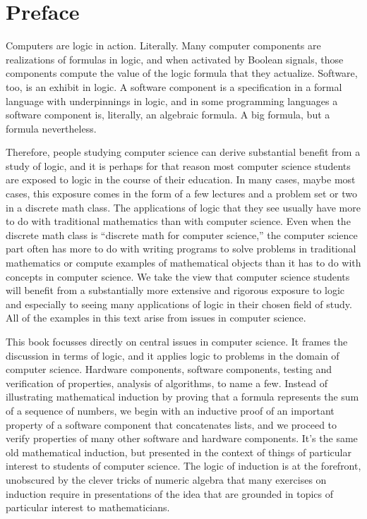 \chapter{Preface}
\label{ch:Preface}

Computers are logic in action. Literally.
Many computer components are realizations of formulas in logic,
and when activated by Boolean signals, those components
compute the value of the logic formula that they actualize.
Software, too, is an exhibit in logic.
A software component is a specification in a formal language
with underpinnings in logic,
and in some programming languages a software component
is, literally, an algebraic formula.
A big formula, but a formula nevertheless.

Therefore, people studying computer science
can derive substantial benefit from a study of logic,
and it is perhaps for that reason most computer science students 
are exposed to logic in the course of their education.
In many cases, maybe most cases, this exposure comes
in the form of a few lectures and a problem set or two
in a discrete math class. The applications of logic that
they see usually have more to do with traditional mathematics
than with computer science. Even when the discrete math class
is ``discrete math for computer science,'' the computer science
part often has more to do with writing programs to solve problems
in traditional mathematics or compute examples of
mathematical objects than it has to do with
concepts in computer science.
We take the view that computer science students will
benefit from a substantially more extensive and rigorous
exposure to logic and especially to seeing many applications of
logic in their chosen field of study.
All of the examples in this text arise from issues in computer science.

This book focusses directly on central issues
in computer science.
It frames the discussion in terms of logic,
and it applies logic to problems in the domain of computer science.
Hardware components, software components,
testing and verification of properties, analysis of algorithms,
to name a few.
Instead of illustrating mathematical induction by  proving
that a formula represents the sum of a sequence of numbers,
we begin with an inductive proof of an important property of 
a software component that concatenates lists, 
and we proceed to verify properties of
many other software and hardware components.
It's the same old mathematical induction, but presented
in the context of things of particular interest to
students of computer science.
The logic of induction is at the forefront, 
unobscured by the clever tricks of numeric algebra
that many exercises on induction require in
presentations of the idea that are grounded in topics
of particular interest to mathematicians.


